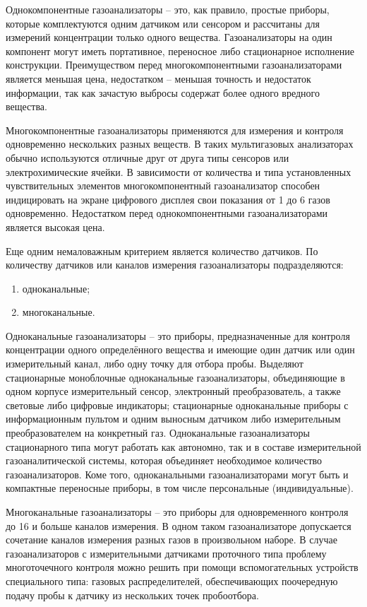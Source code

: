 \documentclass[14pt, a4paper]{extreport}
\begin{document}
	Однокомпонентные газоанализаторы -- это, как правило, простые приборы, которые комплектуются одним датчиком или сенсором и рассчитаны для измерений концентрации только одного вещества. Газоанализаторы на один компонент могут иметь портативное, переносное либо стационарное исполнение конструкции. Преимуществом перед многокомпонентными газоанализаторами является меньшая цена, недостатком -- меньшая точность и недостаток информации, так как зачастую выбросы содержат более одного вредного вещества.
	
	Многокомпонентные газоанализаторы применяются для измерения и контроля одновременно нескольких разных веществ. В таких мультигазовых анализаторах обычно используются отличные друг от друга типы сенсоров или электрохимические ячейки. В зависимости от количества и типа установленных чувствительных элементов многокомпонентный газоанализатор способен индицировать на экране цифрового дисплея свои показания от 1 до 6 газов одновременно. Недостатком перед однокомпонентными газоанализаторами является высокая цена.
	
	Еще одним немаловажным критерием является количество датчиков. По количеству датчиков или каналов измерения газоанализаторы подразделяются:
	\begin{enumerate}[label={\arabic*)}]
		\item одноканальные;
		\item многоканальные.
	\end{enumerate}

	Одноканальные газоанализаторы -- это приборы, предназначенные для контроля концентрации одного определённого вещества и имеющие один датчик или один измерительный канал, либо одну точку для отбора пробы. Выделяют стационарные моноблочные одноканальные газоанализаторы, объединяющие в одном корпусе измерительный сенсор, электронный преобразователь, а также световые либо цифровые индикаторы; стационарные одноканальные приборы с информационным пультом и одним выносным датчиком либо измерительным преобразователем на конкретный газ. Одноканальные газоанализаторы стационарного типа могут работать как автономно, так и в составе измерительной газоаналитической системы, которая объединяет необходимое количество газоанализаторов. Коме того, одноканальными газоанализаторами могут быть и компактные переносные приборы, в том числе персональные (индивидуальные).
	
	Многоканальные газоанализаторы -- это приборы для одновременного контроля до 16 и больше каналов измерения. В одном таком газоанализаторе допускается сочетание каналов измерения разных газов в произвольном наборе. В случае газоанализаторов с измерительными датчиками проточного типа проблему многоточечного контроля можно решить при помощи вспомогательных устройств специального типа: газовых распределителей, обеспечивающих поочередную подачу пробы к датчику из нескольких точек пробоотбора. 
	
\end{document}
